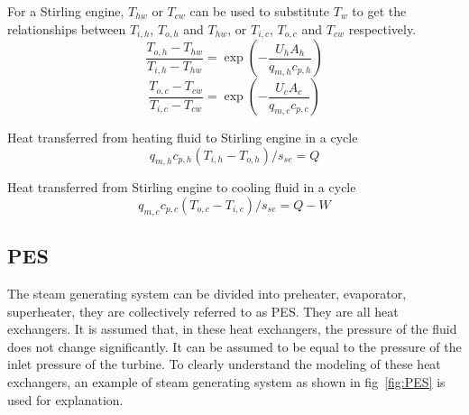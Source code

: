 For a Stirling engine, $T_{hw}$ or $T_{cw}$ can be used to substitute $T_w$ to get the relationships between $T_{i,h}$, $T_{o,h}$ and $T_{hw}$, or $T_{i,c}$, $T_{o,c}$ and $T_{cw}$ respectively.
\begin{equation}
	\frac{T_{o,h}-T_{hw}}{T_{i,h}-T_{hw}}=\exp(-\frac{U_hA_h}{q_{m,h}c_{p,h}})
	\label{Eq:T_h}
\end{equation}
\begin{equation}
	\frac{T_{o,c}-T_{cw}}{T_{i,c}-T_{cw}}=\exp(-\frac{U_cA_c}{q_{m,c}c_{p,c}})
	\label{Eq:T_c}
\end{equation}

Heat transferred from heating fluid to Stirling engine in a cycle
\begin{equation}
	q_{m,h}c_{p,h}(T_{i,h}-T_{o,h})/s_{se} = Q
	\label{Eq:q_h}
\end{equation}

Heat transferred from Stirling engine to cooling fluid in a cycle
\begin{equation}
	q_{m,c}c_{p,c}(T_{o,c}-T_{i,c})/s_{se} = Q - W
	\label{Eq:q_c}
\end{equation}


\subsection{PES}
The steam generating system can be divided into preheater, evaporator, superheater, they are collectively referred to as PES. They are all heat exchangers. It is assumed that, in these heat exchangers, the pressure of the fluid does not change significantly. It can be assumed to be equal to the pressure of the inlet pressure of the turbine. To clearly understand the modeling of these heat exchangers, an example of steam generating system as shown in fig~\ref{fig:PES} is used for explanation.

